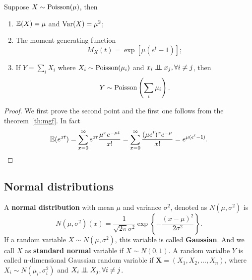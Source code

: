 \begin{theorem}
Suppose $X\sim\text{Poisson}(\mu)$, then
\begin{enumerate}
\item $\mathbb{E}(X)=\mu$ and $\text{Var}(X)=\mu^2$;
\item The moment generating function
\begin{equation}
M_X(t)=\exp[\mu(e^t-1)];
\end{equation}
\item If $Y=\sum_iX_i$ where $X_i\sim\text{Poisson}(\mu_i)$ and $x_i\perp\!\!\!\perp x_j,\forall i\ne j$, then
\begin{equation}
Y\sim\text{Poisson}\left(\sum_i\mu_i\right).
\end{equation}
\end{enumerate}
\end{theorem}

\begin{proof}
We first prove the second point and the first one follows from the theorem~\ref{th:mgf}. In fact
\begin{equation*}
\mathbb{E}(e^{x t})=\sum_{x=0}^\infty e^{x t}\frac{\mu^x e^{-\mu t}}{x!}=\sum_{x=0}^\infty\frac{(\mu e^t)^xe^{-\mu}}{x!}=e^{\mu(e^t-1)}.
\end{equation*} 
\end{proof}



\subsection{Normal distributions}
\begin{definition}
A \textbf{normal distribution} with mean $\mu$ and variance $\sigma^2$, denoted as $N(\mu,\sigma^2)$ is 
\begin{equation}
N(\mu,\sigma^2)(x) = \frac{1}{\sqrt{2\pi}\sigma^2}\exp\left\{-\frac{(x-\mu)^2}{2\sigma^2}\right\}.
\end{equation}
If a random variable $X\sim N(\mu,\sigma^2)$, this variable is called \textbf{Gaussian}. And we call $X$ as \textbf{standard normal} variable if $X\sim N(0,1)$.
A random varialbe $Y$ is called n-dimensional Gaussian random variable if $\boldsymbol{X}=(X_1,X_2,...,X_n)$, where $X_i\sim N(\mu_i,\sigma_i^2)$ and $X_i\perp\!\!\!\perp X_j,\forall i\ne j$.
\end{definition}


